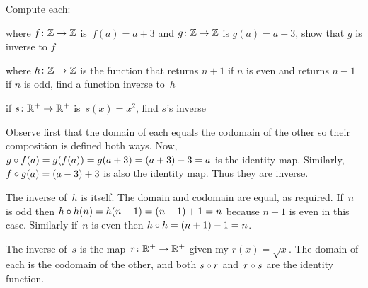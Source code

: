 \documentclass{ibl}  %
\begin{document}
\begin{problem} 
Compute each:
\begin{items}
\item 
  where $\mbox{$f\colon \mathbb{Z}\to \mathbb{Z}$}$ is~$f(a)=a+3$ and 
  $\mbox{$g\colon \mathbb{Z}\to \mathbb{Z}$}$ is $g(a)=a-3$,
  show that $g$ is inverse to $f$
\item
  where $\mbox{$h\colon \mathbb{Z}\to \mathbb{Z}$}$ is the function that returns
  $n+1$ if $n$ is even and returns $n-1$ if $n$ is odd,
  find a function inverse to~$h$
\item
  if $\mbox{$s\colon \mathbb{R}^+\to \mathbb{R}^+$}$ is~$s(x)=x^2$,
  find $s$'s inverse
\end{items}
\begin{ans}
\begin{items}
\item
  Observe first that the domain of each equals the codomain of the other
  so their composition is defined both ways.
  Now, $g\mathbin{\circ} f(a)=g(f(a))=g(a+3)=(a+3)-3=a$
  is the identity map.
  Similarly, $f\mathbin{\circ} g(a)=(a-3)+3$ is also the identity map.
  Thus they are inverse.  
\item
  The inverse of~$h$ is itself.
  The domain and codomain are equal, as required. 
  If~$n$ is odd then $h\mathbin{\circ} h(n)=h(n-1)=(n-1)+1=n$ because 
  $n-1$ is even in this case.
  Similarly if~$n$ is even then $h\mathbin{\circ} h=(n+1)-1=n$.  
\item
  The inverse of~$s$ is the map~$\mbox{$r\colon \mathbb{R}^+\to \mathbb{R}^+$}$ given my 
  $r(x)=\sqrt{x}$.
  The domain of each is the codomain of the other,
  and both $s\mathbin{\circ} r$ and~$r\mathbin{\circ} s$ are the identity function.  
\end{items}
\end{ans}
\end{problem}
\end{document}
